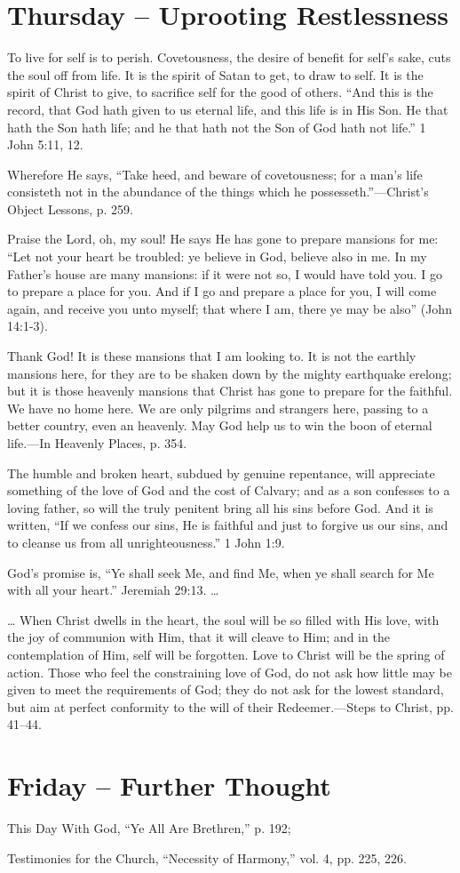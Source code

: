 \documentclass[a4paper, 10pt, twoside, headings=small]{scrartcl}
\begin{document}
\begin{multicols}{2}
\section*{Thursday – Uprooting Restlessness}

To live for self is to perish. Covetousness, the desire of benefit for self’s sake, cuts the soul off from life. It is the spirit of Satan to get, to draw to self. It is the spirit of Christ to give, to sacrifice self for the good of others. “And this is the record, that God hath given to us eternal life, and this life is in His Son. He that hath the Son hath life; and he that hath not the Son of God hath not life.” 1 John 5:11, 12.

Wherefore He says, “Take heed, and beware of covetousness; for a man’s life consisteth not in the abundance of the things which he possesseth.”—Christ’s Object Lessons, p. 259.

Praise the Lord, oh, my soul! He says He has gone to prepare mansions for me: “Let not your heart be troubled: ye believe in God, believe also in me. In my Father’s house are many mansions: if it were not so, I would have told you. I go to prepare a place for you. And if I go and prepare a place for you, I will come again, and receive you unto myself; that where I am, there ye may be also” (John 14:1-3).

Thank God! It is these mansions that I am looking to. It is not the earthly mansions here, for they are to be shaken down by the mighty earthquake erelong; but it is those heavenly mansions that Christ has gone to prepare for the faithful. We have no home here. We are only pilgrims and strangers here, passing to a better country, even an heavenly. May God help us to win the boon of eternal life.—In Heavenly Places, p. 354.

The humble and broken heart, subdued by genuine repentance, will appreciate something of the love of God and the cost of Calvary; and as a son confesses to a loving father, so will the truly penitent bring all his sins before God. And it is written, “If we confess our sins, He is faithful and just to forgive us our sins, and to cleanse us from all unrighteousness.” 1 John 1:9.

God’s promise is, “Ye shall seek Me, and find Me, when ye shall search for Me with all your heart.” Jeremiah 29:13. …

… When Christ dwells in the heart, the soul will be so filled with His love, with the joy of communion with Him, that it will cleave to Him; and in the contemplation of Him, self will be forgotten. Love to Christ will be the spring of action. Those who feel the constraining love of God, do not ask how little may be given to meet the requirements of God; they do not ask for the lowest standard, but aim at perfect conformity to the will of their Redeemer.—Steps to Christ, pp. 41–44.

\section*{Friday – Further Thought}

\setlength{\parindent}{0pt}This Day With God, “Ye All Are Brethren,” p. 192;

Testimonies for the Church, “Necessity of Harmony,” vol. 4, pp. 225, 226.

\end{multicols}
\end{document}
